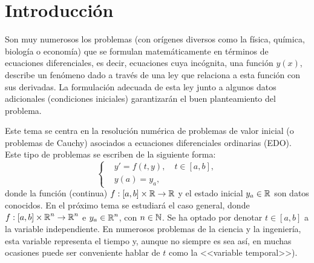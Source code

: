 %
%
\renewcommand{\tt}{t}
\newcommand{\yy}{y}
\newcommand{\yn}{{\yy_n}}
\newcommand{\ynn}{{\yy_{n+1}}}
\newcommand{\ta}{a}
\newcommand{\tb}{b}
\newcommand{\tn}{{\tt_n}}
\newcommand{\tnn}{{\tt_{n+1}}}
\newcommand{\zn}{{z_n}}
\newcommand{\znn}{{z_{n+1}}}
\newcommand{\ycero}{{y_a}}
\newcommand{\sol}{y}
\newcommand{\lipschitz}{$y$--Lipschitz\xspace}
\newcommand{\locLipschitz}{localmente \lipschitz}
\newcommand{\globLipschitz}{\lipschitz}
\newcommand{\errCons}{{\cal E}}
\newcommand{\RK}{Runge--Kutta\xspace}
\newcommand{\AB}{Adams--Bashforth\xspace}
\newcommand{\AM}{Adams--Moulton\xspace}


\section{Introducción}

Son muy numerosos los problemas (con orígenes diversos como la física,
química, biología o economía) que se formulan matemáticamente en
términos de ecuaciones diferenciales, es decir, ecuaciones cuya
incógnita, una función $y(x)$, describe un fenómeno dado a través de
una ley que relaciona a esta función con sus derivadas. La formulación
adecuada de esta ley junto a algunos datos adicionales (condiciones
iniciales) garantizarán el buen planteamiento del problema.

Este tema se centra en la resolución numérica de problemas de valor
inicial (o problemas de Cauchy) asociados a ecuaciones diferenciales
ordinarias (EDO). Este tipo de problemas se escriben de la siguiente
forma:
\begin{equation}
  \label{eq:pvi}
  \tag{PVI}
  \left\{
  \begin{aligned}
    &y' = f(\tt,\yy), \quad \tt\in[\ta,\tb],
    \\
    &y(\ta) = \ycero,
  \end{aligned}
  \right.
\end{equation}
donde la función (continua) $f:[\ta,\tb]\times\Rset\to\Rset$ y el
estado inicial $\ycero\in\Rset$ son datos conocidos. En el próximo
tema se estudiará el caso general, donde
$f:[\ta,\tb]\times\Rset^n\to\Rset^n$ e $\ycero\in\Rset^n$, con
$n\in\operatorname{{\mathbb N}}$. Se ha optado por denotar $t\in [a,b]$ a la variable
independiente.  En numerosos problemas de la ciencia y la ingeniería,
esta variable representa el tiempo y, aunque no siempre es
sea así, en muchas ocasiones puede ser conveniente
hablar de $\tt$ como la <<variable temporal>>).

